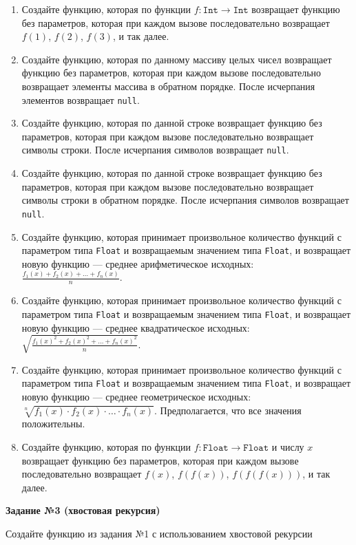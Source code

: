 \begin{enumerate}
    \item Создайте функцию, которая по функции \( f: \texttt{Int} \to \texttt{Int} \) возвращает функцию без параметров, которая при каждом вызове последовательно возвращает \( f(1) \), \( f(2) \), \( f(3) \), и так далее.
    \item Создайте функцию, которая по данному массиву целых чисел возвращает функцию без параметров, которая при каждом вызове последовательно возвращает элементы массива в обратном порядке. После исчерпания элементов возвращает \texttt{null}.
    \item Создайте функцию, которая по данной строке возвращает функцию без параметров, которая при каждом вызове последовательно возвращает символы строки. После исчерпания символов возвращает \texttt{null}.
    \item Создайте функцию, которая по данной строке возвращает функцию без параметров, которая при каждом вызове последовательно возвращает символы строки в обратном порядке. После исчерпания символов возвращает \texttt{null}.
    \item Создайте функцию, которая принимает произвольное количество функций с параметром типа \texttt{Float} и возвращаемым значением типа \texttt{Float}, и возвращает новую функцию — среднее арифметическое исходных: \( \frac{f_1(x) + f_2(x) + \dots + f_n(x)}{n} \).
    \item Создайте функцию, которая принимает произвольное количество функций с параметром типа \texttt{Float} и возвращаемым значением типа \texttt{Float}, и возвращает новую функцию — среднее квадратическое исходных: \( \sqrt{\frac{f_1(x)^2 + f_2(x)^2 + \dots + f_n(x)^2}{n}} \).
    \item Создайте функцию, которая принимает произвольное количество функций с параметром типа \texttt{Float} и возвращаемым значением типа \texttt{Float}, и возвращает новую функцию — среднее геометрическое исходных: \( \sqrt[n]{f_1(x) \cdot f_2(x) \cdot \dots \cdot f_n(x)} \). Предполагается, что все значения положительны.
    \item Создайте функцию, которая по функции \( f: \texttt{Float} \to \texttt{Float} \) и числу \( x \) возвращает функцию без параметров, которая при каждом вызове последовательно возвращает \( f(x) \), \( f(f(x)) \), \( f(f(f(x))) \), и так далее.
\end{enumerate}

\textbf{Задание №3 (хвостовая рекурсия)}

Создайте функцию из задания №1 с использованием хвостовой рекурсии
